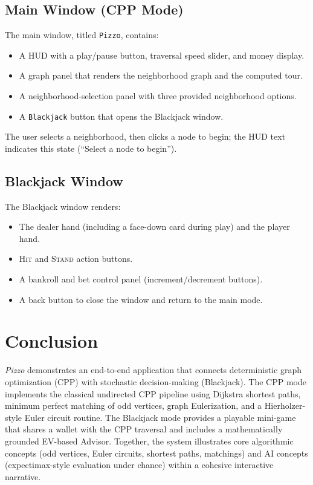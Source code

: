 \documentclass[conference]{IEEEtran}
\begin{document}
\subsection{Main Window (CPP Mode)}
The main window, titled \texttt{Pizzo}, contains:
\begin{itemize}
  \item A HUD with a play/pause button, traversal speed slider, and money display.
  \item A graph panel that renders the neighborhood graph and the computed tour.
  \item A neighborhood-selection panel with three provided neighborhood options.
  \item A \texttt{Blackjack} button that opens the Blackjack window.
\end{itemize}
The user selects a neighborhood, then clicks a node to begin; the HUD text indicates this state (``Select a node to begin'').

\subsection{Blackjack Window}
The Blackjack window renders:
\begin{itemize}
  \item The dealer hand (including a face-down card during play) and the player hand.
  \item \textsc{Hit} and \textsc{Stand} action buttons.
  \item A bankroll and bet control panel (increment/decrement buttons).
  \item A back button to close the window and return to the main mode.
\end{itemize}

\section{Conclusion}
\emph{Pizzo} demonstrates an end-to-end application that connects deterministic graph optimization (CPP) with stochastic decision-making (Blackjack).
The CPP mode implements the classical undirected CPP pipeline using Dijkstra shortest paths, minimum perfect matching of odd vertices, graph Eulerization, and a Hierholzer-style Euler circuit routine.
The Blackjack mode provides a playable mini-game that shares a wallet with the CPP traversal and includes a mathematically grounded EV-based Advisor.
Together, the system illustrates core algorithmic concepts (odd vertices, Euler circuits, shortest paths, matchings) and AI concepts (expectimax-style evaluation under chance) within a cohesive interactive narrative.
\end{document}
